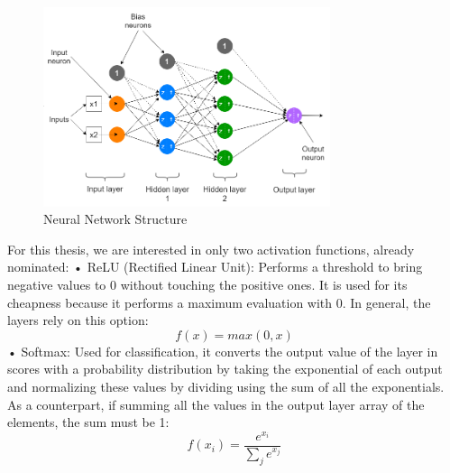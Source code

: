 \begin{center}
    \begin{figure}[!h]
        \centering
        \includegraphics[width=0.75\textwidth]{images/2.05 Neural Network Structure.png}
        \caption{Neural Network Structure}
    \end{figure}
\end{center}
For this thesis, we are interested in only two activation functions, already nominated:\newline
• ReLU (Rectified Linear Unit): Performs a threshold to bring negative values to 0 without touching the positive ones. It is used for its cheapness because it performs a maximum evaluation with 0. In general, the layers rely on this option:\newline
\begin{equation}
    f(x)=max(0,x)
\end{equation}
• Softmax: Used for classification, it converts the output value of the layer in scores with a probability distribution by taking the exponential of each output and normalizing these values by dividing using the sum of all the exponentials. As a counterpart, if summing all the values in the output layer array of the elements, the sum must be 1:\newline
\begin{equation}
    f(x_i)=\frac{e^{x_i}}{\sum_je^{x_j}}
\end{equation}
